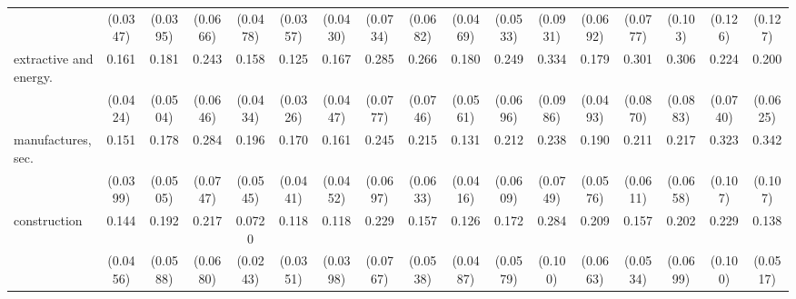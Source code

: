 {\begin{tabular}{l*{16}{c}}
                    &    (0.0347)         &    (0.0395)         &    (0.0666)         &    (0.0478)         &    (0.0357)         &    (0.0430)         &    (0.0734)         &    (0.0682)         &    (0.0469)         &    (0.0533)         &    (0.0931)         &    (0.0692)         &    (0.0777)         &     (0.103)         &     (0.126)         &     (0.127)         \\
[1em]
extractive and energy.&       0.161\sym{***}&       0.181\sym{***}&       0.243\sym{***}&       0.158\sym{***}&       0.125\sym{***}&       0.167\sym{***}&       0.285\sym{***}&       0.266\sym{***}&       0.180\sym{***}&       0.249\sym{***}&       0.334\sym{***}&       0.179\sym{***}&       0.301\sym{***}&       0.306\sym{***}&       0.224\sym{***}&       0.200\sym{***}\\
                    &    (0.0424)         &    (0.0504)         &    (0.0646)         &    (0.0434)         &    (0.0326)         &    (0.0447)         &    (0.0777)         &    (0.0746)         &    (0.0561)         &    (0.0696)         &    (0.0986)         &    (0.0493)         &    (0.0870)         &    (0.0883)         &    (0.0740)         &    (0.0625)         \\
[1em]
manufactures, sec.  &       0.151\sym{***}&       0.178\sym{***}&       0.284\sym{***}&       0.196\sym{***}&       0.170\sym{***}&       0.161\sym{***}&       0.245\sym{***}&       0.215\sym{***}&       0.131\sym{***}&       0.212\sym{***}&       0.238\sym{***}&       0.190\sym{***}&       0.211\sym{***}&       0.217\sym{***}&       0.323\sym{***}&       0.342\sym{***}\\
                    &    (0.0399)         &    (0.0505)         &    (0.0747)         &    (0.0545)         &    (0.0441)         &    (0.0452)         &    (0.0697)         &    (0.0633)         &    (0.0416)         &    (0.0609)         &    (0.0749)         &    (0.0576)         &    (0.0611)         &    (0.0658)         &     (0.107)         &     (0.107)         \\
[1em]
construction        &       0.144\sym{***}&       0.192\sym{***}&       0.217\sym{***}&      0.0720\sym{***}&       0.118\sym{***}&       0.118\sym{***}&       0.229\sym{***}&       0.157\sym{***}&       0.126\sym{***}&       0.172\sym{***}&       0.284\sym{***}&       0.209\sym{***}&       0.157\sym{***}&       0.202\sym{***}&       0.229\sym{***}&       0.138\sym{***}\\
                    &    (0.0456)         &    (0.0588)         &    (0.0680)         &    (0.0243)         &    (0.0351)         &    (0.0398)         &    (0.0767)         &    (0.0538)         &    (0.0487)         &    (0.0579)         &     (0.100)         &    (0.0663)         &    (0.0534)         &    (0.0699)         &     (0.100)         &    (0.0517)         \\

\end{tabular}}

